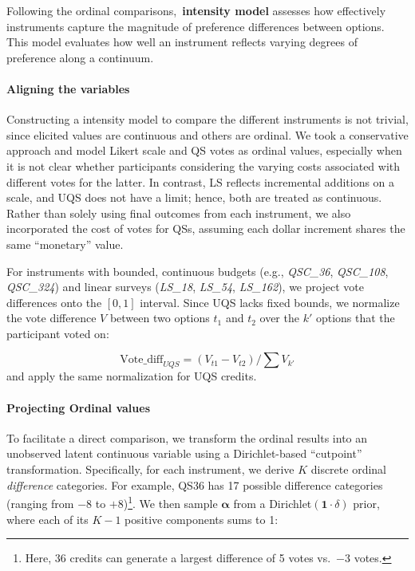 Following the ordinal comparisons,~\textbf{intensity model} assesses how effectively instruments capture the magnitude of preference differences between options. This model evaluates how well an instrument reflects varying degrees of preference along a continuum.

\paragraph{Aligning the variables} Constructing a intensity model to compare the different instruments is not trivial, since elicited values are continuous and others are ordinal. We took a conservative approach and model Likert scale and QS votes as ordinal values, especially when it is not clear whether participants considering the varying costs associated with different votes for the latter. In contrast, LS reflects incremental additions on a scale, and UQS does not have a limit; hence, both are treated as continuous. Rather than solely using final outcomes from each instrument, we also incorporated the cost of votes for QSs, assuming each dollar increment shares the same ``monetary'' value.

For instruments with bounded, continuous budgets (e.g., \textit{QSC\_36}, \textit{QSC\_108}, \textit{QSC\_324}) and linear surveys (\textit{LS\_18}, \textit{LS\_54}, \textit{LS\_162}), we project vote differences onto the $[0,1]$ interval. Since UQS lacks fixed bounds, we normalize the vote difference $V$ between two options $t_1$ and $t_2$ over the $k'$ options that the participant voted on:

\begin{equation}
    \text{Vote\_diff}_{UQS} 
    = (V_{t1} - V_{t2})/\textstyle\sum V_{k'}
\end{equation}
and apply the same normalization for UQS credits.

\paragraph{Projecting Ordinal values} 
To facilitate a direct comparison, we transform the ordinal results into an unobserved latent continuous variable using a Dirichlet-based ``cutpoint'' transformation. Specifically, for each instrument, we derive $K$ discrete ordinal \emph{difference} categories. For example, QS36 has 17 possible difference categories (ranging from $-8$ to $+8$)\footnote{Here, 36 credits can generate a largest difference of 5 votes vs.\ $-3$ votes.}. We then sample
\(\boldsymbol{\alpha}\) from a Dirichlet$(\mathbf{1}\cdot\delta)$ prior, where each of its $K-1$ positive components sums to 1:

